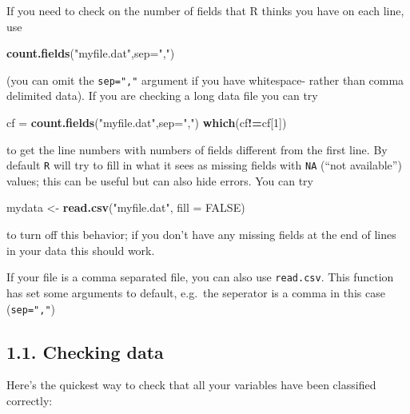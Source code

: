\documentclass[11pt,]{article}
\newenvironment{Shaded}{\begin{snugshade}}{\end{snugshade}}
\newcommand{\KeywordTok}[1]{\textcolor[rgb]{0.13,0.29,0.53}{\textbf{#1}}}
\newcommand{\DataTypeTok}[1]{\textcolor[rgb]{0.13,0.29,0.53}{#1}}
\newcommand{\DecValTok}[1]{\textcolor[rgb]{0.00,0.00,0.81}{#1}}
\newcommand{\StringTok}[1]{\textcolor[rgb]{0.31,0.60,0.02}{#1}}
\newcommand{\OtherTok}[1]{\textcolor[rgb]{0.56,0.35,0.01}{#1}}
\newcommand{\OperatorTok}[1]{\textcolor[rgb]{0.81,0.36,0.00}{\textbf{#1}}}
\newcommand{\NormalTok}[1]{#1}
\begin{document}
If you need to check on the number of fields that R thinks you have on
each line, use

\begin{Shaded}
\begin{Highlighting}[]
\KeywordTok{count.fields}\NormalTok{(}\StringTok{"myfile.dat"}\NormalTok{,}\DataTypeTok{sep=}\StringTok{","}\NormalTok{)}
\end{Highlighting}
\end{Shaded}

(you can omit the \texttt{sep=","} argument if you have whitespace-
rather than comma delimited data). If you are checking a long data file
you can try

\begin{Shaded}
\begin{Highlighting}[]
\NormalTok{cf =}\StringTok{ }\KeywordTok{count.fields}\NormalTok{(}\StringTok{"myfile.dat"}\NormalTok{,}\DataTypeTok{sep=}\StringTok{","}\NormalTok{)}
\KeywordTok{which}\NormalTok{(cf}\OperatorTok{!=}\NormalTok{cf[}\DecValTok{1}\NormalTok{])}
\end{Highlighting}
\end{Shaded}

to get the line numbers with numbers of fields different from the first
line. By default \texttt{R} will try to fill in what it sees as missing
fields with \texttt{NA} (``not available'') values; this can be useful
but can also hide errors. You can try

\begin{Shaded}
\begin{Highlighting}[]
\NormalTok{mydata <-}\StringTok{ }\KeywordTok{read.csv}\NormalTok{(}\StringTok{"myfile.dat"}\NormalTok{, }\DataTypeTok{fill =} \OtherTok{FALSE}\NormalTok{)}
\end{Highlighting}
\end{Shaded}

to turn off this behavior; if you don't have any missing fields at the
end of lines in your data this should work.

If your file is a comma separated file, you can also use
\texttt{read.csv}. This function has set some arguments to default,
e.g.~the seperator is a comma in this case (\texttt{sep=","})

\subsection{1.1. Checking data}\label{checking-data}

Here's the quickest way to check that all your variables have been
classified correctly:
\end{document}
